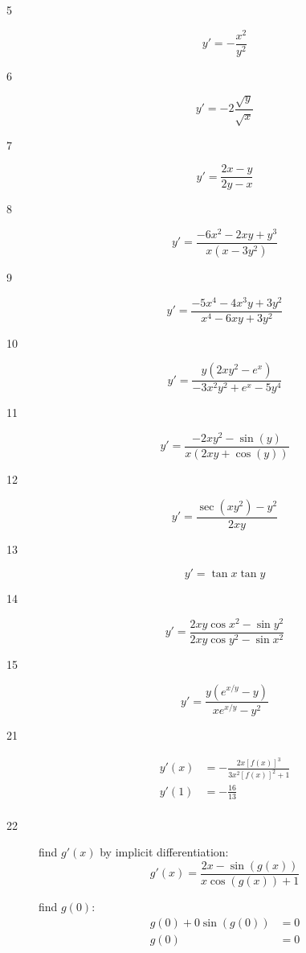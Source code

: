 \documentclass[letterpaper]{exam}
\begin{document}
  \begin{description}

    \item[5] 
      \[
        y' = - \frac{x^2}{y^2} 
      \]


    \item[6] 
      \[
        y' = -2 \frac{\sqrt{y}}{\sqrt{x}} 
      \]

    \item[7] 
      \[
        y' = \frac{2x - y}{2y - x}
      \]

    \item[8] 
      \[
        y' = \frac{ - 6x^2 - 2xy + y^3}{x \left(x - 3y^2 \right)} 
      \]

    \item[9] 
      \[
        y' = \frac{-5 x^4-4 x^3 y+3 y^2}{x^4-6 x y+3 y^2}
      \]

    \item[10] 
      \[
        y' = \frac{y \left(2x y^2 - e^x\right)}{ - 3x^2 y^2 + e^x - 5 y^4}
      \]

    \item[11] 
      \[
        y' = \frac{ - 2x y^2 - \sin (y)}{x (2x y + \cos (y))}
      \]

    \item[12] 
      \[
        y' = \frac{\sec \left( x y^2 \right) - y^2 }{2x y}
      \]

    \item[13] 
      \[
        y' = \tan x \tan y
      \]

    \item[14] 
      \[
        y' = \frac{2x y \cos x^2 - \sin y^2}{2x y \cos y^2 - \sin x^2}
      \]

    \item[15] 
      \[
        y' = \frac{y \left( e^{x/y} - y \right)}{x e^{x/y} - y^2}
      \]

    \item[21] 
      \begin{align*}
        y'(x) & = - \frac{2x [f(x)]^3}{3x^2 [f(x)]^2 + 1} \\
        y'(1) & = \boxed{ - \frac{16}{13} } \\
      \end{align*}

    \item[22] 
      find $g'(x)$ by implicit differentiation:
      \[
        g'(x) = \frac{2x - \sin (g(x)) }{x \cos (g(x)) + 1}
      \]

      find $g(0)$:
      \begin{align*}
        g(0) + 0 \sin(g(0)) & = 0 \\
        g(0)                & = 0 \\
      \end{align*}


\end{description}
\end{document}
